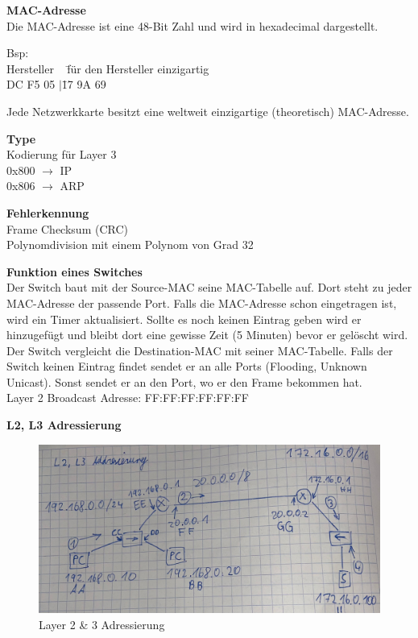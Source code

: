 \textbf{MAC-Adresse} \\
Die MAC-Adresse ist eine 48-Bit Zahl und wird in hexadecimal dargestellt.
\begin{tabbing}
	Bsp:\\
	Hersteller ~ \= für den Hersteller einzigartig \\
	DC F5 05 $\vert$\= 17 9A 69 \\
\end{tabbing}

Jede Netzwerkkarte besitzt eine weltweit einzigartige (theoretisch) MAC-Adresse.

\textbf{Type} \\
Kodierung für Layer 3 \\
0x800 $\rightarrow$ IP \\
0x806 $\rightarrow$ ARP 

\textbf{Fehlerkennung} \\
Frame Checksum (CRC) \\
Polynomdivision mit einem Polynom von Grad 32

\textbf{Funktion eines Switches} \\
Der Switch baut mit der Source-MAC seine MAC-Tabelle auf. Dort steht zu jeder MAC-Adresse der passende Port. Falls die MAC-Adresse schon eingetragen ist, wird ein Timer aktualisiert. Sollte es noch keinen Eintrag geben wird er hinzugefügt und bleibt dort eine gewisse Zeit (5 Minuten) bevor er gelöscht wird. Der Switch vergleicht die Destination-MAC mit seiner MAC-Tabelle. Falls der Switch keinen Eintrag findet sendet er an alle Ports (Flooding, Unknown Unicast). Sonst sendet er an den Port, wo er den Frame bekommen hat. \\
Layer 2 Broadcast Adresse: FF:FF:FF:FF:FF:FF

\textbf{L2, L3 Adressierung}
\begin{figure}[H]
	\centering
	\includegraphics[width=1.0\linewidth]{figures/l2l3add.jpeg}
	\caption{Layer 2 \& 3 Adressierung}
	\label{fig:l2l3add}
\end{figure}

